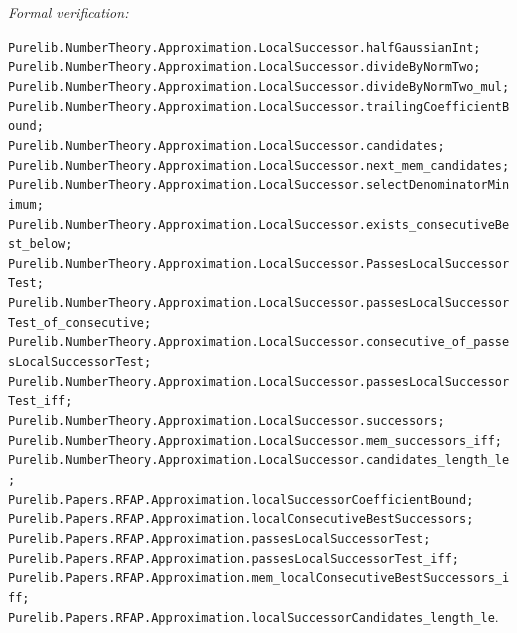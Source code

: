 \documentclass[11pt]{article}
\newcommand{\leanref}[1]{\par\smallskip\noindent
  \emph{Formal verification:}\par\nobreak
  {\raggedright\nolinkurl{#1}.\par}}
\begin{document}
\leanref{Purelib.NumberTheory.Approximation.LocalSuccessor.halfGaussianInt;
Purelib.NumberTheory.Approximation.LocalSuccessor.divideByNormTwo;
Purelib.NumberTheory.Approximation.LocalSuccessor.divideByNormTwo_mul;
Purelib.NumberTheory.Approximation.LocalSuccessor.trailingCoefficientBound;
Purelib.NumberTheory.Approximation.LocalSuccessor.candidates;
Purelib.NumberTheory.Approximation.LocalSuccessor.next_mem_candidates;
Purelib.NumberTheory.Approximation.LocalSuccessor.selectDenominatorMinimum;
Purelib.NumberTheory.Approximation.LocalSuccessor.exists_consecutiveBest_below;
Purelib.NumberTheory.Approximation.LocalSuccessor.PassesLocalSuccessorTest;
Purelib.NumberTheory.Approximation.LocalSuccessor.passesLocalSuccessorTest_of_consecutive;
Purelib.NumberTheory.Approximation.LocalSuccessor.consecutive_of_passesLocalSuccessorTest;
Purelib.NumberTheory.Approximation.LocalSuccessor.passesLocalSuccessorTest_iff;
Purelib.NumberTheory.Approximation.LocalSuccessor.successors;
Purelib.NumberTheory.Approximation.LocalSuccessor.mem_successors_iff;
Purelib.NumberTheory.Approximation.LocalSuccessor.candidates_length_le;
Purelib.Papers.RFAP.Approximation.localSuccessorCoefficientBound;
Purelib.Papers.RFAP.Approximation.localConsecutiveBestSuccessors;
Purelib.Papers.RFAP.Approximation.passesLocalSuccessorTest;
Purelib.Papers.RFAP.Approximation.passesLocalSuccessorTest_iff;
Purelib.Papers.RFAP.Approximation.mem_localConsecutiveBestSuccessors_iff;
Purelib.Papers.RFAP.Approximation.localSuccessorCandidates_length_le}
\end{document}
